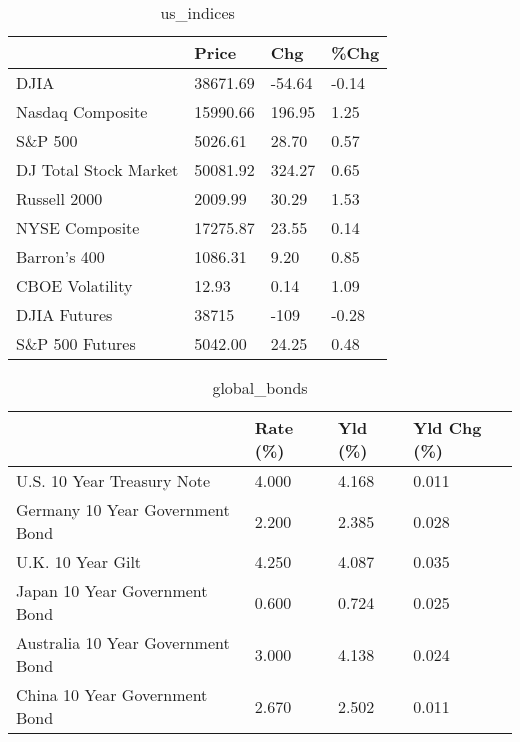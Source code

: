 \documentclass{article}%
\begin{document}
%


\begin{table}[htbp]%
\caption{us\_indices}%
\centering%
\begin{adjustbox}{width=1\textwidth}%
\begin{tabular}{llll}
\toprule
                      &    Price &    Chg &  \%Chg \\
\midrule
                 DJIA & 38671.69 & -54.64 & -0.14 \\
     Nasdaq Composite & 15990.66 & 196.95 &  1.25 \\
              S\&P 500 &  5026.61 &  28.70 &  0.57 \\
DJ Total Stock Market & 50081.92 & 324.27 &  0.65 \\
         Russell 2000 &  2009.99 &  30.29 &  1.53 \\
       NYSE Composite & 17275.87 &  23.55 &  0.14 \\
         Barron's 400 &  1086.31 &   9.20 &  0.85 \\
      CBOE Volatility &    12.93 &   0.14 &  1.09 \\
         DJIA Futures &    38715 &   -109 & -0.28 \\
      S\&P 500 Futures &  5042.00 &  24.25 &  0.48 \\
\bottomrule
\end{tabular}
%
\end{adjustbox}%
\end{table}

%


\begin{table}[htbp]%
\caption{global\_bonds}%
\centering%
\begin{adjustbox}{width=1\textwidth}%
\begin{tabular}{llll}
\toprule
                                  & Rate (\%) & Yld (\%) & Yld Chg (\%) \\
\midrule
       U.S. 10 Year Treasury Note &    4.000 &   4.168 &       0.011 \\
  Germany 10 Year Government Bond &    2.200 &   2.385 &       0.028 \\
                U.K. 10 Year Gilt &    4.250 &   4.087 &       0.035 \\
    Japan 10 Year Government Bond &    0.600 &   0.724 &       0.025 \\
Australia 10 Year Government Bond &    3.000 &   4.138 &       0.024 \\
    China 10 Year Government Bond &    2.670 &   2.502 &       0.011 \\
\bottomrule
\end{tabular}
%
\end{adjustbox}%
\end{table}
\end{document}
